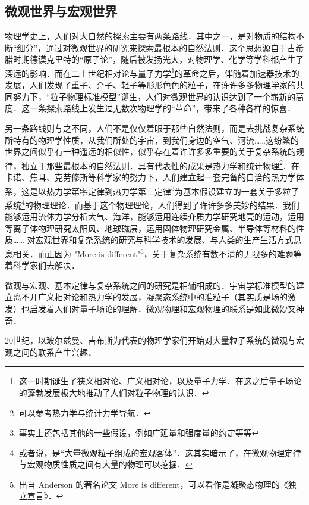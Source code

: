 \subsection{微观世界与宏观世界}
物理学史上，人们对大自然的探索主要有两条路线．其中之一，是对物质的结构不断“细分”，通过对微观世界的研究来探索最根本的自然法则．这个思想源自于古希腊时期德谟克里特的“原子论”，随后被发扬光大，对物理学、化学等学科都产生了深远的影响．而在二士世纪相对论与量子力学\footnote{这一时期诞生了狭义相对论、广义相对论，以及量子力学．在这之后量子场论的蓬勃发展极大地推动了人们对粒子物理的认识．}的革命之后，伴随着加速器技术的发展，人们发现了重子、介子、轻子等形形色色的粒子，在许许多多物理学家的共同努力下，“粒子物理标准模型”诞生，人们对微观世界的认识达到了一个崭新的高度．这一条探索路线上发生过无数次物理学的“革命”，带来了各种各样的惊喜．

另一条路线则与之不同，人们不是仅仅着眼于那些自然法则，而是去挑战复杂系统所特有的物理学性质，从我们所处的宇宙，到我们身边的空气、河流……这纷繁的世界之间似乎有一种遥远的相似性，似乎存在着许许多多重要的关于复杂系统的规律，独立于那些最根本的自然法则．具有代表性的成果是热力学和统计物理\footnote{可以参考热力学与统计力学导航．}．在卡诺、焦耳、克劳修斯等科学家的努力下，人们建立起一套完备的自洽的热力学体系，这是以热力学第零定律到热力学第三定律\footnote{事实上还包括其他的一些假设，例如广延量和强度量的约定等等}为基本假设建立的一套关于多粒子系统\footnote{或者说，是“大量微观粒子组成的宏观客体”．这其实暗示了，在微观物理定律与宏观物质性质之间有大量的物理可以挖掘．}的物理理论．而基于这个物理理论，人们得到了许许多多美妙的结果．我们能够运用流体力学分析大气、海洋，能够运用连续介质力学研究地壳的运动，运用等离子体物理研究太阳风、地球磁层，运用固体物理研究金属、半导体等材料的性质…… 对宏观世界和复杂系统的研究与科学技术的发展、与人类的生产生活方式息息相关．而正因为 "More is different"\footnote{出自 Anderson 的著名论文 More is different，可以看作是凝聚态物理的《独立宣言》．}，关于复杂系统有数不清的无限多的难题等着科学家们去解决．

微观与宏观、基本定律与复杂系统之间的研究是相辅相成的．宇宙学标准模型的建立离不开广义相对论和热力学的发展，凝聚态系统中的准粒子（其实质是场的激发）也启发着人们对量子场论的理解．微观物理和宏观物理的联系是如此微妙又神奇．

20世纪，以玻尔兹曼、吉布斯为代表的物理学家们开始对大量粒子系统的微观与宏观之间的联系产生兴趣．